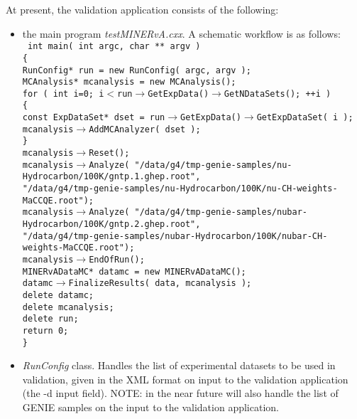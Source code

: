 At present, the validation application consists of the following:
\begin{itemize}
\item{the main program {\it testMINERvA.cxx}.
A schematic workflow is as follows: \\
{\tt 
int main( int argc, char ** argv ) \\
\{   \\
RunConfig* run      = new RunConfig( argc, argv ); \\
MCAnalysis* mcanalysis = new MCAnalysis(); \\
   for ( int i=0; i$<$run$\rightarrow$GetExpData()$\rightarrow$GetNDataSets(); ++i ) \\
   \{ \\
      const ExpDataSet* dset   = run$\rightarrow$GetExpData()$\rightarrow$GetExpDataSet( i ); \\
      mcanalysis$\rightarrow$AddMCAnalyzer( dset ); \\
   \} \\
   mcanalysis$\rightarrow$Reset(); \\
   mcanalysis$\rightarrow$Analyze( "/data/g4/tmp-genie-samples/nu-Hydrocarbon/100K/gntp.1.ghep.root", \\
                        "/data/g4/tmp-genie-samples/nu-Hydrocarbon/100K/nu-CH-weights-MaCCQE.root"); \\
   mcanalysis$\rightarrow$Analyze( "/data/g4/tmp-genie-samples/nubar-Hydrocarbon/100K/gntp.2.ghep.root", \\
                        "/data/g4/tmp-genie-samples/nubar-Hydrocarbon/100K/nubar-CH-weights-MaCCQE.root"); \\
   mcanalysis$\rightarrow$EndOfRun(); \\
   MINERvADataMC* datamc = new MINERvADataMC(); \\   
   datamc$\rightarrow$FinalizeResults( data, mcanalysis ); \\
   delete datamc; \\
   delete mcanalysis; \\
   delete run; \\
   return 0; \\
\} \\
}
}
\item{ {\it RunConfig } class. Handles the list of experimental datasets to be used in validation, given
in the XML format on input to the validation application (the -d input field).  
NOTE: in the near future will also handle the list of GENIE samples on the input to the validation application.}

\end{itemize}
